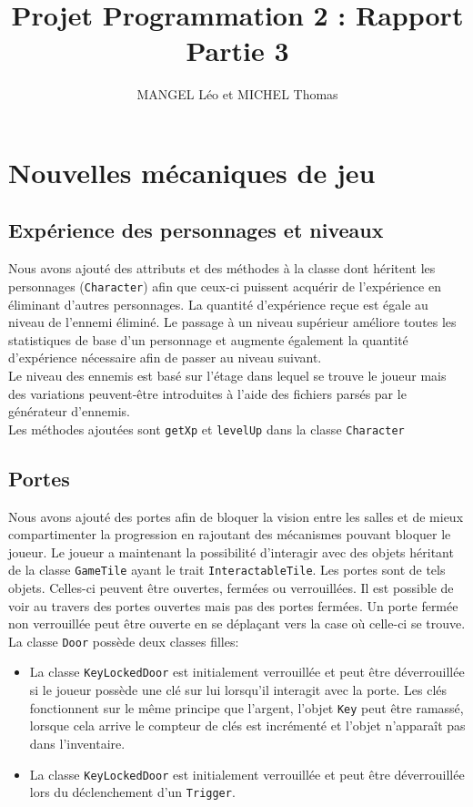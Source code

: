 \documentclass[10pt,a4paper]{article}
\title{Projet Programmation 2 : Rapport Partie 3}
\author{MANGEL Léo et MICHEL Thomas}
\date{}
\begin{document}
\maketitle

\section{Nouvelles mécaniques de jeu}
\subsection{Expérience des personnages et niveaux}
Nous avons ajouté des attributs et des méthodes à la classe dont héritent les personnages (\texttt{Character}) afin que ceux-ci puissent acquérir de l'expérience en éliminant d'autres personnages. La quantité d'expérience reçue est égale au niveau de l'ennemi éliminé. Le passage à un niveau supérieur améliore toutes les statistiques de base d'un personnage et augmente également la quantité d'expérience nécessaire afin de passer au niveau suivant.\\
Le niveau des ennemis est basé sur l'étage dans lequel se trouve le joueur mais des variations peuvent-être introduites à l'aide des fichiers parsés par le générateur d'ennemis.\\
Les méthodes ajoutées sont \texttt{getXp} et \texttt{levelUp} dans la classe \texttt{Character}

\subsection{Portes}
Nous avons ajouté des portes afin de bloquer la vision entre les salles et de mieux compartimenter la progression en rajoutant des mécanismes pouvant bloquer le joueur. Le joueur a maintenant la possibilité d'interagir avec des objets héritant de la classe \texttt{GameTile} ayant le trait \texttt{InteractableTile}. Les portes sont de tels objets. Celles-ci peuvent être ouvertes, fermées ou verrouillées. Il est possible de voir au travers des portes ouvertes mais pas des portes fermées. Un porte fermée non verrouillée peut être ouverte en se déplaçant vers la case où celle-ci se trouve.\\
La classe \texttt{Door} possède deux classes filles:
\begin{itemize}
	\item La classe \texttt{KeyLockedDoor} est initialement verrouillée et peut être déverrouillée si le joueur possède une clé sur lui lorsqu'il interagit avec la porte. Les clés fonctionnent sur le même principe que l'argent, l'objet \texttt{Key} peut être ramassé, lorsque cela arrive le compteur de clés est incrémenté et l'objet n'apparaît pas dans l'inventaire.
	\item La classe \texttt{KeyLockedDoor} est initialement verrouillée et peut être déverrouillée lors du déclenchement d'un \texttt{Trigger}.
\end{itemize}
\end{document}
